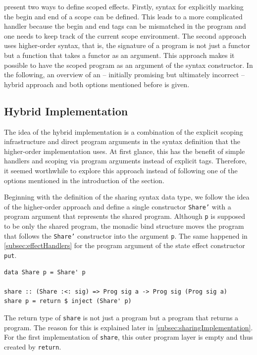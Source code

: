 \documentclass[a4paper, 11pt, fleqn, twoside]{scrreprt}
\newcommand{\hinl}[1]{\texttt{#1}}
\begin{document}
\citet{wu2014effect} present two ways to define scoped effects.
Firstly, syntax for explicitly marking the begin and end of a scope can be defined.
This leads to a more complicated handler because the begin and end tags can be mismatched in the program and one needs to keep track of the current scope environment.
The second approach uses higher-order syntax, that is, the signature of a program is not just a functor but a function that takes a functor as an argument.
This approach makes it possible to have the scoped program as an argument of the syntax constructor.
In the following, an overview of an  -- initially promising but ultimately incorrect  -- hybrid approach and both options mentioned before is given.

\subsection{Hybrid Implementation}

The idea of the hybrid implementation is a combination of the explicit scoping infrastructure and direct program arguments in the syntax definition that the higher-order implementation uses.
At first glance, this has the benefit of simple handlers and scoping via program arguments instead of explicit tags.
Therefore, it seemed worthwhile to explore this approach instead of following one of the options mentioned in the introduction of the section.

Beginning with the definition of the sharing syntax data type, we follow the idea of the higher-order approach and define a single constructor \hinl{Share'} with a program argument that represents the shared program.
Although \hinl{p} is supposed to be only the shared program, the monadic bind structure moves the program that follows the \hinl{Share'} constructor into the argument \hinl{p}.
The same happened in \autoref{subsec:effectHandlers} for the program argument of the state effect constructor \hinl{put}.

\begin{verbatim}
data Share p = Share' p

share :: (Share :<: sig) => Prog sig a -> Prog sig (Prog sig a)
share p = return $ inject (Share' p)
\end{verbatim}

The return type of \hinl{share} is not just a program but a program that returns a program.
The reason for this is explained later in \autoref{subsec:sharingImplementation}.
For the first implementation of \hinl{share}, this outer program layer is empty and thus created by \hinl{return}.
\end{document}
